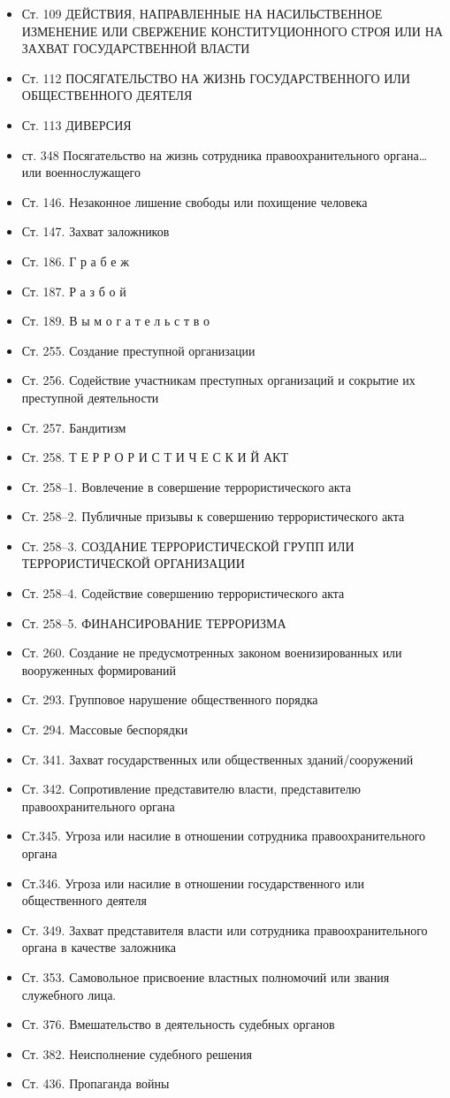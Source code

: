 \begin{itemize}
\begin{itemize}
  \item Ст. 109 ДЕЙСТВИЯ, НАПРАВЛЕННЫЕ НА НАСИЛЬСТВЕННОЕ ИЗМЕНЕНИЕ ИЛИ СВЕРЖЕНИЕ КОНСТИТУЦИОННОГО СТРОЯ ИЛИ НА ЗАХВАТ ГОСУДАРСТВЕННОЙ ВЛАСТИ
  \item Ст. 112 ПОСЯГАТЕЛЬСТВО НА ЖИЗНЬ ГОСУДАРСТВЕННОГО ИЛИ ОБЩЕСТВЕННОГО ДЕЯТЕЛЯ
  \item Ст. 113 ДИВЕРСИЯ
  \item ст. 348 Посягательство на жизнь сотрудника правоохранительного органа… или военнослужащего
  \item Ст. 146. Незаконное лишение свободы или похищение человека
  \item Ст. 147. Захват заложников
  \item Ст. 186. Г р а б е ж
  \item Ст. 187. Р а з б о й
  \item Ст. 189. В ы м о г а т е л ь с т в о
  \item Ст. 255. Создание преступной организации
  \item Ст. 256. Содействие участникам преступных организаций и сокрытие их преступной деятельности
  \item Ст. 257. Бандитизм
  \item Ст. 258. Т Е Р Р О Р И С Т И Ч Е С К И Й АКТ
  \item Ст. 258--1. Вовлечение в совершение террористического акта
  \item Ст. 258--2. Публичные призывы к совершению террористического акта
  \item Ст. 258--3. СОЗДАНИЕ ТЕРРОРИСТИЧЕСКОЙ ГРУПП ИЛИ ТЕРРОРИСТИЧЕСКОЙ ОРГАНИЗАЦИИ
  \item Ст. 258--4. Содействие совершению террористического акта
  \item Ст. 258--5. ФИНАНСИРОВАНИЕ ТЕРРОРИЗМА
  \item Ст. 260. Создание не предусмотренных законом военизированных или вооруженных формирований
  \item Ст. 293. Групповое нарушение общественного порядка
  \item Ст. 294. Массовые беспорядки
  \item Ст. 341. Захват государственных или общественных зданий/сооружений
  \item Ст. 342. Сопротивление представителю власти, представителю правоохранительного органа
  \item Ст.345. Угроза или насилие в отношении сотрудника правоохранительного органа
  \item Ст.346. Угроза или насилие в отношении государственного или общественного деятеля
  \item Ст. 349. Захват представителя власти или сотрудника правоохранительного органа в качестве заложника
  \item Ст. 353. Самовольное присвоение властных полномочий или звания служебного лица.
  \item Ст. 376. Вмешательство в деятельность судебных органов
  \item Ст. 382. Неисполнение судебного решения
  \item Ст. 436. Пропаганда войны
\end{itemize}


\end{itemize}
